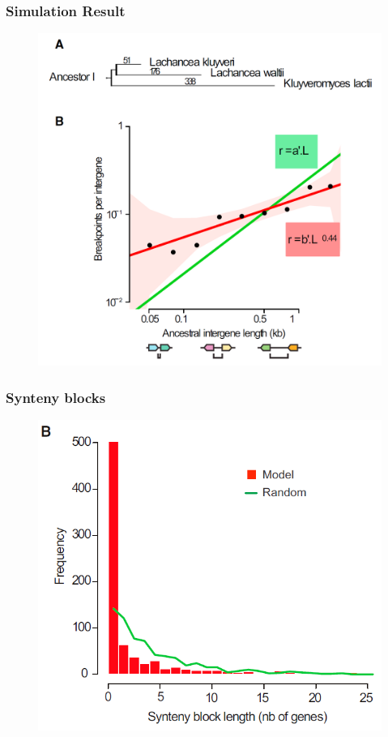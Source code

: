 \documentclass[svgnames,14pt]{beamer}
\begin{document}
\begin{frame}
\frametitle{Simulation Result}
\begin{figure}
	\centering
	\includegraphics[scale = .3]{Yeasts.png}
\end{figure}
\end{frame}

\begin{frame}
\frametitle{Synteny blocks}
\begin{figure}
	\centering
	\includegraphics[scale = .5]{Synteny.png}
\end{figure}
\end{frame}
\end{document}
